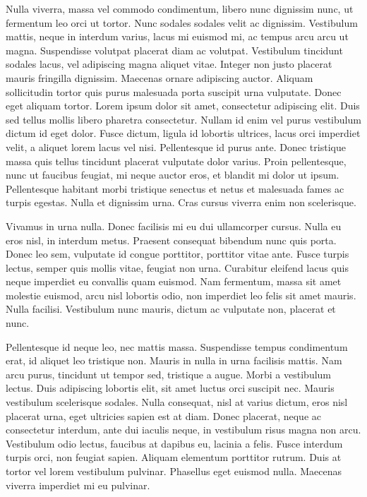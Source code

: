 Nulla viverra, massa vel commodo condimentum, libero nunc dignissim nunc, ut fermentum leo orci ut tortor.
Nunc sodales sodales velit ac dignissim.
Vestibulum mattis, neque in interdum varius, lacus mi euismod mi, ac tempus arcu arcu ut magna.
Suspendisse volutpat placerat diam ac volutpat.
Vestibulum tincidunt sodales lacus, vel adipiscing magna aliquet vitae.
Integer non justo placerat mauris fringilla dignissim.
Maecenas ornare adipiscing auctor.
Aliquam sollicitudin tortor quis purus malesuada porta suscipit urna vulputate.
Donec eget aliquam tortor.
Lorem ipsum dolor sit amet, consectetur adipiscing elit.
Duis sed tellus mollis libero pharetra consectetur.
Nullam id enim vel purus vestibulum dictum id eget dolor.
Fusce dictum, ligula id lobortis ultrices, lacus orci imperdiet velit, a aliquet lorem lacus vel nisi.
Pellentesque id purus ante.
Donec tristique massa quis tellus tincidunt placerat vulputate dolor varius.
Proin pellentesque, nunc ut faucibus feugiat, mi neque auctor eros, et blandit mi dolor ut ipsum.
Pellentesque habitant morbi tristique senectus et netus et malesuada fames ac turpis egestas.
Nulla et dignissim urna.
Cras cursus viverra enim non scelerisque.

Vivamus in urna nulla.
Donec facilisis mi eu dui ullamcorper cursus.
Nulla eu eros nisl, in interdum metus.
Praesent consequat bibendum nunc quis porta.
Donec leo sem, vulputate id congue porttitor, porttitor vitae ante.
Fusce turpis lectus, semper quis mollis vitae, feugiat non urna.
Curabitur eleifend lacus quis neque imperdiet eu convallis quam euismod.
Nam fermentum, massa sit amet molestie euismod, arcu nisl lobortis odio, non imperdiet leo felis sit amet mauris.
Nulla facilisi.
Vestibulum nunc mauris, dictum ac vulputate non, placerat et nunc.

Pellentesque id neque leo, nec mattis massa.
Suspendisse tempus condimentum erat, id aliquet leo tristique non.
Mauris in nulla in urna facilisis mattis.
Nam arcu purus, tincidunt ut tempor sed, tristique a augue.
Morbi a vestibulum lectus.
Duis adipiscing lobortis elit, sit amet luctus orci suscipit nec.
Mauris vestibulum scelerisque sodales.
Nulla consequat, nisl at varius dictum, eros nisl placerat urna, eget ultricies sapien est at diam.
Donec placerat, neque ac consectetur interdum, ante dui iaculis neque, in vestibulum risus magna non arcu.
Vestibulum odio lectus, faucibus at dapibus eu, lacinia a felis.
Fusce interdum turpis orci, non feugiat sapien.
Aliquam elementum porttitor rutrum.
Duis at tortor vel lorem vestibulum pulvinar.
Phasellus eget euismod nulla.
Maecenas viverra imperdiet mi eu pulvinar.

